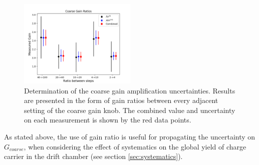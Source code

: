\begin{figure}[H]
  \includegraphics[width=0.5\textwidth]{graphics/coarse_gain_calibration.png}
  \caption{Determination of the coarse gain amplification uncertainties. Results are presented in the form of gain ratios between every adjacent setting of the coarse gain knob. The combined value and uncertainty on each measurement is shown by the red data points.}
  \label{fig:coarse_gain}
\end{figure}


As stated above, the use of gain ratio is useful for propagating the uncertainty on $G_{coarse}$, when considering the effect of systematics on the global yield of charge carrier in the drift chamber (see section \ref{sec:systematics}).
